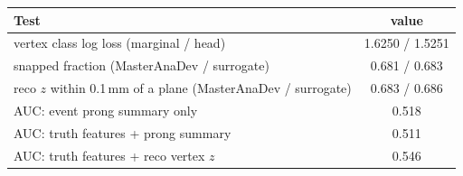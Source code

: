 \begin{tabular}{lc}
\toprule
Test & value \\
\midrule
vertex class log loss (marginal / head) & 1.6250 / 1.5251 \\
snapped fraction (MasterAnaDev / surrogate) & 0.681 / 0.683 \\
reco $z$ within 0.1\,mm of a plane (MasterAnaDev / surrogate) & 0.683 / 0.686 \\
\midrule
AUC: event prong summary only & 0.518 \\
AUC: truth features + prong summary & 0.511 \\
AUC: truth features + reco vertex $z$ & 0.546 \\
\bottomrule
\end{tabular}

